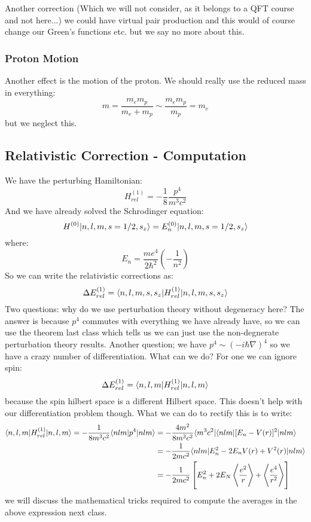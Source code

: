 Another correction (Which we will not consider, as it belongs to a QFT course and not here...) we could have virtual pair production and this would of course change our Green's functions etc. but we say no more about this.

\subsubsection{Proton Motion}
Another effect is the motion of the proton. We should really use the reduced mass in everything:
\begin{equation}
    m = \frac{m_em_p}{m_e + m_p} \sim \frac{m_em_p}{m_p} =  m_e
\end{equation}
but we neglect this.

\subsection{Relativistic Correction - Computation}
We have the perturbing Hamiltonian:
\begin{equation}
    H^{(1)}_{rel} = -\frac{1}{8}\frac{p^4}{m^3c^2}
\end{equation}
And we have already solved the Schrodinger equation:
\begin{equation}
    H^{(0)}\lvert n,l,m,s=1/2, s_z \rangle = E^{(0)}_n\lvert n,l,m,s=1/2, s_z \rangle
\end{equation}
where:
\begin{equation}
    E_n = \frac{me^4}{2\hbar^2}\left(-\frac{1}{n^2}\right)
\end{equation}
So we can write the relativistic corrections as:
\begin{equation}
    \Delta E^{(1)}_{rel} = \langle n, l, m, s, s_z \rvert H^{(1)}_{rel}\lvert n, l, m, s, s_z \rangle
\end{equation}
Two questions: why do we use perturbation theory without degeneracy here? The answer is because $p^4$ commutes with everything we have already have, so we can use the theorem last class which tells us we can just use the non-degnerate perturbation theory results. Another question; we have $p^4 \sim (-i\hbar \nabla)^4$ so we have a crazy number of differentiation. What can we do? For one we can ignore spin:
\begin{equation}
    \Delta E^{(1)}_{rel} = \langle n, l, m \rvert H^{(1)}_{rel}\lvert n, l, m \rangle
\end{equation}
because the spin hilbert space is a different Hilbert space. This doesn't help with our differentiation problem though. What we can do to rectify this is to write:
\begin{equation}
    \begin{split}
        \langle n, l, m \rvert H^{(1)}_{rel}\lvert n, l, m \rangle = -\frac{1}{8m^3c^2}\langle nlm \rvert p^4\lvert nlm \rangle &=-\frac{4m^2}{8m^3c^2}\langle m^3c^2 \rvert\langle nlm \rvert[E_n - V(r)]^2\lvert nlm \rangle
        \\ &= - \frac{1}{2mc^2}\langle nlm \rvert E_n^2 - 2E_nV(r) + V^2(r)\lvert nlm \rangle
        \\ &= -\frac{1}{2mc^2}\left[E_n^2 + 2E_N\left< \frac{e^2}{r} \right> + \left< \frac{e^4}{r^2} \right>\right]
    \end{split}
\end{equation}
we will discuss the mathematical tricks required to compute the averages in the above expression next class.

